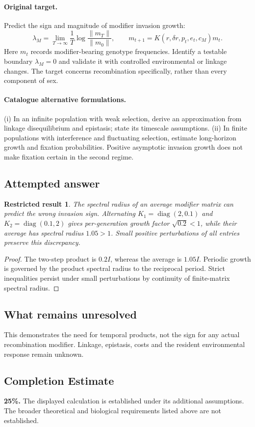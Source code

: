 \documentclass[11pt]{article}
\newtheorem{attemptresult}{Restricted result}[section]
\begin{document}
\paragraph{Original target.}
Predict the sign and magnitude of modifier invasion growth:
\[
\lambda_M=\lim_{T\to\infty}\frac1T\log\frac{\|m_T\|}{\|m_0\|},
\qquad
m_{t+1}=K(r,\delta r,p_t,e_t,c_M)m_t.
\]
Here $m_t$ records modifier-bearing genotype frequencies. Identify a testable boundary $\lambda_M=0$ and validate it with controlled environmental or linkage changes. The target concerns recombination specifically, rather than every component of sex.
\paragraph{Catalogue alternative formulations.}
(i) In an infinite population with weak selection, derive an approximation from linkage disequilibrium and epistasis; state its timescale assumptions. (ii) In finite populations with interference and fluctuating selection, estimate long-horizon growth and fixation probabilities. Positive asymptotic invasion growth does not make fixation certain in the second regime.
\subsection{Attempted answer}
\begin{attemptresult}
The spectral radius of an average modifier matrix can predict the wrong invasion sign. Alternating $K_1=\operatorname{diag}(2,0.1)$ and $K_2=\operatorname{diag}(0.1,2)$ gives per-generation growth factor $\sqrt{0.2}<1$, while their average has spectral radius $1.05>1$. Small positive perturbations of all entries preserve this discrepancy.
\end{attemptresult}
\begin{proof}
The two-step product is $0.2I$, whereas the average is $1.05I$. Periodic growth is governed by the product spectral radius to the reciprocal period. Strict inequalities persist under small perturbations by continuity of finite-matrix spectral radius.
\end{proof}
\subsection{What remains unresolved}
This demonstrates the need for temporal products, not the sign for any actual recombination modifier. Linkage, epistasis, costs and the resident environmental response remain unknown.
\subsection{Completion Estimate}
\textbf{25\%.} The displayed calculation is established under its additional assumptions. The broader theoretical and biological requirements listed above are not established.
\end{document}
